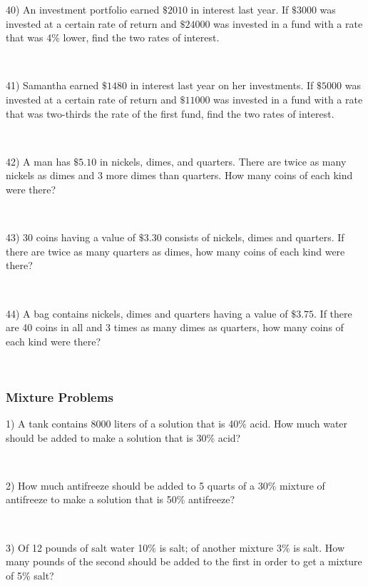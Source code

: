 40) An investment portfolio earned $\$2010$ in interest last year. If
$\$3000$ was invested at a certain rate of
return and $\$24000$ was invested in a fund with a rate
that was 4\% lower, find the two rates of interest.\par
~\par

41) Samantha earned $\$1480$ in interest last year on her
investments. If $\$5000$ was invested at a certain rate of
return and $\$11000$ was invested in a fund with a rate
that was two-thirds the rate of the first fund, find the two rates of interest.\par
~\par

42) A man has $\$5.10$ in nickels, dimes, and quarters. There are
twice as many nickels as dimes and 3 more dimes than
quarters. How many coins of each kind were there?\par
~\par

43) 30 coins having a value of $\$3.30$ consists of nickels, dimes
and quarters. If there are twice as many quarters as
dimes, how many coins of each kind were there?\par
~\par

44) A bag contains nickels, dimes and quarters having a value of
$\$3.75$. If there are 40 coins in all and 3 times as
many dimes as quarters, how many coins of each kind were there?\par
~\par

\newpage

\subsubsection{Mixture Problems}\par

{}

1) A tank contains 8000 liters of a solution that is 40\% acid. How much water should be added to make a solution that is 30\% acid?\par
~\par

2) How much antifreeze should be added to 5 quarts of a 30\% mixture of antifreeze to make a solution that is 50\%
antifreeze?\par
~\par

3) Of 12 pounds of salt water 10\% is salt; of another mixture 3\% is salt.
How many pounds of the second should be added to the first
in order to get a mixture of 5\% salt?\par
~\par


